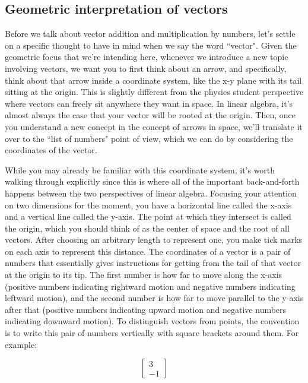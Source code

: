 \subsection{Geometric interpretation of vectors}

Before we talk about vector addition and multiplication by numbers, let's settle
on a specific thought to have in mind when we say the word ``vector". Given the
geometric focus that we're intending here, whenever we introduce a new topic
involving vectors, we want you to first think about an arrow, and specifically,
think about that arrow inside a coordinate system, like the x-y plane with its
tail sitting at the origin. This is slightly different from the physics student
perspective where vectors can freely sit anywhere they want in space. In linear
algebra, it's almost always the case that your vector will be rooted at the
origin. Then, once you understand a new concept in the concept of arrows in
space, we'll translate it over to the ``list of numbers" point of view, which we
can do by considering the coordinates of the vector.

While you may already be familiar with this coordinate system, it's worth
walking through explicitly since this is where all of the important
back-and-forth happens between the two perspectives of linear algebra. Focusing
your attention on two dimensions for the moment, you have a horizontal line
called the x-axis and a vertical line called the y-axis. The point at which they
intersect is called the origin, which you should think of as the center of
space and the root of all vectors. After choosing an arbitrary length to
represent one, you make tick marks on each axis to represent this distance. The
coordinates of a vector is a pair of numbers that essentially gives instructions
for getting from the tail of that vector at the origin to its tip. The first
number is how far to move along the x-axis (positive numbers indicating
rightward motion and negative numbers indicating leftward motion), and the
second number is how far to move parallel to the y-axis after that (positive
numbers indicating upward motion and negative numbers indicating downward
motion). To distinguish vectors from points, the convention is to write this
pair of numbers vertically with square brackets around them. For example:

\begin{equation*}
  \begin{bmatrix}
    3 \\
    -1
  \end{bmatrix}
\end{equation*}

